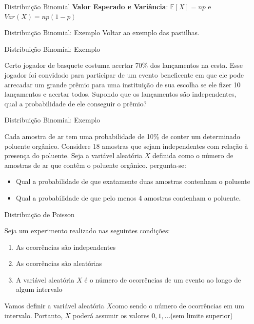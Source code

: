\begin{frame}{Distribuição Binomial}
    \textbf{Valor Esperado e Variância}: $\mathbb{E}[X] = np$ e $Var(X) = np(1-p)$
\end{frame}

\begin{frame}{Distribuição Binomial: Exemplo}
    Voltar ao exemplo das pastilhas. 
\end{frame}
\begin{frame}{Distribuição Binomial: Exemplo}
    \begin{exemplo}[14]
        Certo jogador de basquete costuma acertar 70\% dos lançamentos
na cesta. Esse jogador foi convidado para participar de um evento beneficente
em que ele pode arrecadar um grande prêmio para uma instituição de sua escolha se ele fizer 10 lançamentos e acertar todos. Supondo que os lançamentos
são independentes, qual a probabilidade de ele conseguir o prêmio?
    \end{exemplo}
\end{frame}

\begin{frame}{Distribuição Binomial: Exemplo}
    \begin{exemplo}[16]
        Cada amostra de ar tem uma probabilidade de 10\% de conter um determinado poluente orgânico. Considere 18 amostras que sejam independentes com relação à presença do poluente. Seja a variável aleatória $X$ definida como o número de amostras de ar que contêm o poluente orgânico. pergunta-se:

        \begin{itemize}
            \item Qual a probabilidade de que exatamente duas amostras contenham o poluente
            \item Qual a probabilidade de que pelo menos 4 amostras contenham o poluente. 
        \end{itemize}
    \end{exemplo}
\end{frame}

\begin{frame}{Distribuição de Poisson}

Seja um experimento realizado nas seguintes condições:

\begin{enumerate}
    \item As ocorrências são independentes
    \item As ocorrências são aleatórias
    \item A variável aleatória $X$ é o número de ocorrências de um evento ao longo de algum intervalo
\end{enumerate}

    Vamos definir a variável aleatória $X$como sendo o número de ocorrências em um intervalo. Portanto, $X$ poderá assumir os valores $0, 1, \dots $(sem limite superior)
\end{frame}

